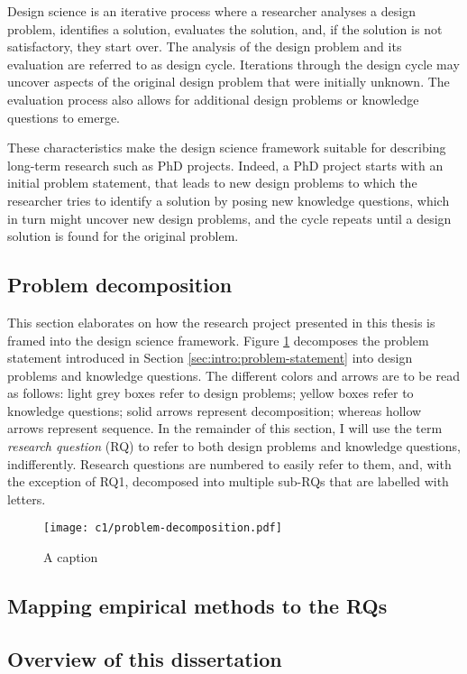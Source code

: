 Design science is an iterative process where a researcher analyses a design problem, identifies a solution, evaluates the solution, and, if the solution is not satisfactory, they start over. 
The analysis of the design problem and its evaluation are referred to as design cycle.
Iterations through the design cycle may uncover aspects of the original design problem that were initially unknown.
The evaluation process also allows for additional design problems or knowledge questions to emerge.

These characteristics make the design science framework suitable for describing long-term research such as PhD projects.
Indeed, a PhD project starts with an initial problem statement, that leads to new design problems to which the researcher tries to identify a solution by posing new knowledge questions, which in turn might uncover new design problems, and the cycle repeats until a design solution is found for the original problem.

\subsection{Problem decomposition}
This section elaborates on how the research project presented in this thesis is framed into the design science framework. 
Figure \ref{fig:intro:problem-decomposition} decomposes the problem statement introduced in Section \ref{sec:intro:problem-statement} into design problems and knowledge questions.
The different colors and arrows are to be read as follows: light grey boxes refer to design problems; yellow boxes refer to knowledge questions; solid arrows represent decomposition; whereas hollow arrows represent sequence.
In the remainder of this section, I will use the term \emph{research question} (RQ) to refer to both design problems and knowledge questions, indifferently.
Research questions are numbered to easily refer to them, and, with the exception of RQ1, decomposed into multiple sub-RQs that are labelled with letters.

\begin{figure}
    \centering
    \texttt{[image: c1/problem-decomposition.pdf]}
    \caption{A caption}\label{fig:intro:problem-decomposition}
\end{figure}

\subsection{Mapping empirical methods to the RQs}

\subsection{Overview of this dissertation}

